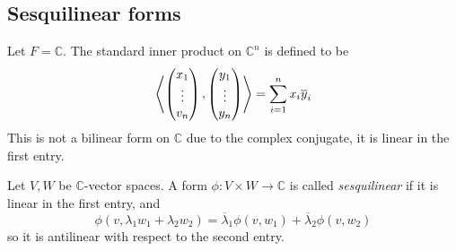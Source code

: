 \subsection{Sesquilinear forms}
Let \( F = \mathbb C \).
The standard inner product on \( \mathbb C^n \) is defined to be
\[
	\left\langle{\begin{pmatrix} x_1 \\ \vdots \\ v_n \end{pmatrix}, \begin{pmatrix} y_1 \\ \vdots \\ y_n \end{pmatrix}}\right\rangle = \sum_{i=1}^n x_i \overline y_i
\]
This is not a bilinear form on \( \mathbb C \) due to the complex conjugate, it is linear in the first entry.
\begin{definition}
	Let \( V, W \) be \( \mathbb C \)-vector spaces.
	A form \( \phi \colon V \times W \to \mathbb C \) is called \textit{sesquilinear} if it is linear in the first entry, and
	\[
		\phi(v, \lambda_1 w_1 + \lambda_2 w_2) = \overline \lambda_1 \phi(v,w_1) + \overline \lambda_2 \phi(v,w_2)
	\]
	so it is antilinear with respect to the second entry.
\end{definition}
